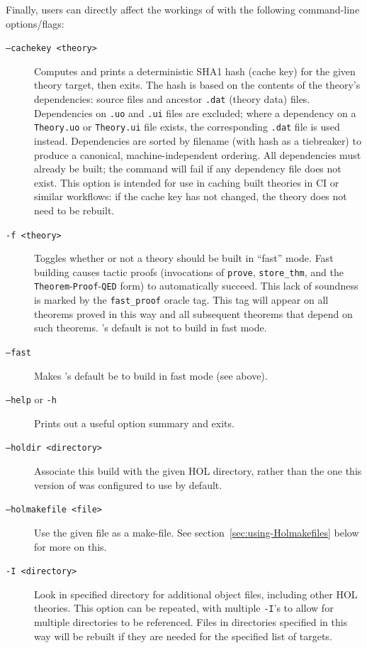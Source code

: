 \noindent Finally, users can directly affect the workings of \holmake{}
with the following command-line options/flags:
\begin{description}
\item[\texttt{--cachekey <theory>}] Computes and prints a deterministic SHA1 hash (cache key) for the given theory target, then exits.
  The hash is based on the contents of the theory's dependencies: source files and ancestor \texttt{.dat} (theory data) files.
  Dependencies on \texttt{.uo} and \texttt{.ui} files are excluded; where a dependency on a \texttt{Theory.uo} or \texttt{Theory.ui} file exists, the corresponding \texttt{.dat} file is used instead.
  Dependencies are sorted by filename (with hash as a tiebreaker) to produce a canonical, machine-independent ordering.
  All dependencies must already be built; the command will fail if any dependency file does not exist.
  This option is intended for use in caching built theories in CI or similar workflows: if the cache key has not changed, the theory does not need to be rebuilt.
\item[\texttt{-f <theory>}] Toggles whether or not a theory should be
  built in ``fast'' mode.
  Fast building causes tactic proofs (invocations of \texttt{prove}, \texttt{store\_thm}, and the \texttt{Theorem}-\texttt{Proof}-\texttt{QED} form) to automatically succeed.
  This lack of soundness is marked by the \texttt{fast\_proof} oracle tag.
  This tag will appear on all theorems proved in this way and all subsequent theorems that depend on such theorems.
  \holmake's default is not to build in fast mode.
\item[\texttt{--fast}] Makes \holmake's default be to build in fast
  mode (see above).
\item[{\tt --help} or {\tt -h}] Prints out a useful option summary and
  exits.
\item[\tt --holdir <directory>] Associate this build with the given
  HOL directory, rather than the one this version of \holmake{} was
  configured to use by default.
\item[\tt --holmakefile <file>] Use the given file as a make-file.
  See section~\ref{sec:using-Holmakefiles} below for more on this.
\item[\tt -I <directory>]
  Look in specified directory for additional object files, including other HOL theories.
  This option can be repeated, with multiple {\tt -I}'s to allow for multiple directories to be referenced.
  Files in directories specified in this way will be rebuilt if they are needed for the specified list of targets.

\end{description}
